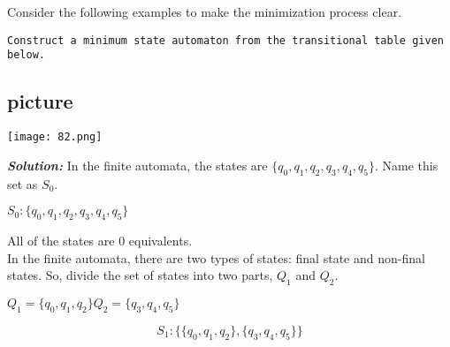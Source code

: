 \documentclass[a4,9pt]{beamer}
\begin{document}
\begin{frame}

Consider the following examples to make the minimization process clear.

\vspace*{0.3cm}
\hspace*{0.1cm} \texttt{Construct a minimum state automaton from the transitional table given below.}

\pause
\begin{center}
\section{picture}
\texttt{[image: 82.png]}
\end{center}
\end{frame}

\begin{frame}

\emph{\textbf{Solution:}} In the finite automata, the states are $\{q_0, q_1, q_2, q_3, q_4, q_5\}$. Name this set as $S_0$.
\begin{center}
$S_0: \{q_0, q_1, q_2, q_3, q_4, q_5\}$
\end{center}

All of the states are 0 equivalents.\\
\hspace*{0.2cm} In the finite automata, there are two types of states: final state and non-final states. So, divide the set
of states into two parts, $Q_1$ and $Q_2$.\\

\begin{center}
$Q_1 = \{q_0, q_1, q_2\} Q_2 = \{q_3, q_4, q_5\}$

\vspace*{0.1cm}
\[
S_1: \{\{q_0, q_1, q_2\}, \{q_3, q_4, q_5\}\}
\]
\end{center}
\end{frame}
\end{document}
